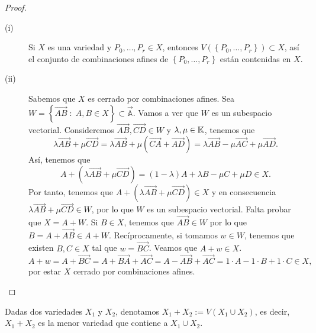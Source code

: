 \begin{proof}
\begin{description}
	\item[(i)] Si $\displaystyle X $ es una variedad y $\displaystyle P_{0}, \ldots, P_{r} \in X $, entonces $\displaystyle V\left( \left\{ P_{0}, \ldots, P_{r}\right\} \right)\subset X $, así el conjunto de combinaciones afines de $\displaystyle \left\{ P_{0}, \ldots, P_{r}\right\}  $ están contenidas en $\displaystyle X $. 
	\item[(ii)] Sabemos que $\displaystyle X $ es cerrado por combinaciones afines. Sea $\displaystyle W = \left\{ \overrightarrow{AB} \; : \; A,B \in X\right\} \subset \vec{\mathbb{A}} $. Vamos a ver que $\displaystyle W $ es un subespacio vectorial. Consideremos $\displaystyle \overrightarrow{AB}, \overrightarrow{CD} \in W $ y $\displaystyle \lambda, \mu \in \mathbb{K} $, tenemos que
		\[\lambda \overrightarrow{AB} + \mu \overrightarrow{CD} = \lambda \overrightarrow{AB} + \mu\left(\overrightarrow{CA} + \overrightarrow{AD}\right) = \lambda \overrightarrow{AB} -\mu\overrightarrow{AC} + \mu\overrightarrow{AD} .\]
		Así, tenemos que 
		\[A + \left(\lambda \overrightarrow{AB} + \mu\overrightarrow{CD}\right) = \left(1-\lambda \right)A + \lambda B -\mu C + \mu D \in X .\]
	Por tanto, tenemos que $\displaystyle A + \left(\lambda \overrightarrow{AB} + \mu\overrightarrow{CD}\right) \in X $ y en consecuencia $\displaystyle \lambda \overrightarrow{AB} + \mu \overrightarrow{CD} \in W $, por lo que $\displaystyle W $ es un subespacio vectorial. Falta probar que $\displaystyle X = A + W $. Si $\displaystyle B \in X $, tenemos que $\displaystyle \overrightarrow{AB} \in W $ por lo que $\displaystyle B = A + \overrightarrow{AB} \in A + W $. Recíprocamente, si tomamos $\displaystyle w \in W $, tenemos que existen $\displaystyle B,C \in X $ tal que $\displaystyle w = \overrightarrow{BC} $. Veamos que $\displaystyle A + w \in X $. 
	\[A + w = A + \overrightarrow{BC} = A + \overrightarrow{BA} + \overrightarrow{AC}= A - \overrightarrow{AB} + \overrightarrow{AC} = 1 \cdot A - 1 \cdot B + 1 \cdot C \in X ,\]
	por estar $\displaystyle X $ cerrado por combinaciones afines.
\end{description}
\end{proof}
\begin{notation}
Dadas dos variedades $\displaystyle X_{1} $ y $\displaystyle X_{2} $, denotamos $\displaystyle X_{1} + X_{2} := V\left(X_{1} \cup X_{2}\right) $, es decir, $\displaystyle X_{1} + X_{2} $ es la menor variedad que contiene a $\displaystyle X_{1} \cup X_{2} $.
\end{notation}
